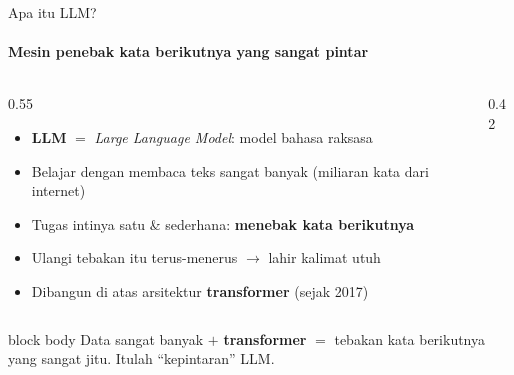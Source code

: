 \documentclass[aspectratio=169,t]{beamer}
\begin{document}
\begin{frame}{Apa itu LLM?}
  \framesubtitle{Mesin penebak kata berikutnya yang sangat pintar}
  \begin{columns}[T]
    \begin{column}{0.55\textwidth}
      \begin{itemize}
        \footnotesize
        \item \textbf{LLM} $=$ \emph{Large Language Model}: model bahasa raksasa
        \item Belajar dengan membaca teks sangat banyak (miliaran kata dari internet)
        \item Tugas intinya satu \& sederhana: \textbf{menebak kata berikutnya}
        \item[\textcolor{nvgreen}{\checkmark}] Ulangi tebakan itu terus-menerus $\to$ lahir kalimat utuh
        \item Dibangun di atas arsitektur \textbf{transformer} (sejak 2017)
      \end{itemize}
    \end{column}
    \begin{column}{0.42\textwidth}
      \begin{center}
      \end{center}
    \end{column}
  \end{columns}
  \vspace{0.3em}
  \begin{beamercolorbox}[rounded=true,shadow=false,sep=4pt]{block body}
    \small\color{white}
    Data sangat banyak $+$ \textbf{transformer} $=$ tebakan kata berikutnya yang sangat jitu. Itulah ``kepintaran'' LLM.
  \end{beamercolorbox}
\end{frame}
\end{document}
